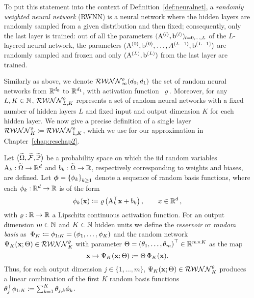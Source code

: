 To put this statement into the context of Definition~\ref{def:neuralnet}, a \textit{randomly weighted neural network} (RWNN) is a neural network where the hidden layers are randomly sampled from a given distribution and then fixed; consequently, only the last layer is trained:
out of all the parameters $(\mathrm{A}^{(l)}, \mathrm{b}^{(l)})_{l=0,\ldots,L}$ of the $L$-layered neural network, the parameters $(\mathrm{A}^{(0)}, \mathrm{b}^{(0)}, \ldots, A^{(L-1)}, \mathrm{b}^{(L-1)})$ are randomly sampled and frozen and only $(\mathrm{A}^{(L)}, \mathrm{b}^{(L)})$ from the last layer are trained. 

Similarly as above, we denote $\mathcal{RWNN}_{\infty}^{\varrho}(d_0,d_1)$ the set of random neural networks from $\mathbb{R}^{d_0}$ to $\mathbb{R}^{d_1}$, with activation function~$\varrho$. %
Moreover, for any $L, K \in \mathbb{N}$, $\mathcal{RWNN}_{L, K}^\varrho$ represents a set of random neural networks with a fixed number of hidden layers $L$ and fixed input and output dimension $K$ for each hidden layer. 
We now give a precise definition of a single layer $\mathcal{RWNN}^\varrho_{K}\coloneqq\mathcal{RWNN}^\varrho_{1, K}$, which we use for our approximation in Chapter~\ref{chap:reschap2}.

\begin{definition}\label{def:RWNN}
Let $\big(\widetilde{\Omega}, \widetilde{\mathcal{F}}, \widetilde{\mathbb{P}}\big)$ be a probability space on which the iid random variables $\mathrm{A}_{k}: \widetilde{\Omega} \rightarrow \mathbb{R}^{d}$ and $b_{k}: \widetilde{\Omega} \rightarrow \mathbb{R}$, respectively corresponding to weights and biases, are defined. Let $\boldsymbol{\phi}=\left\{\phi_{k}\right\}_{k \geq 1}$ denote a sequence of random basis functions, where each $\phi_{k}: \mathbb{R}^{d} \to\mathbb{R}$ is of the form
$$
\phi_{k}(\boldsymbol{\mathrm{x}})\coloneqq\varrho\left(\mathrm{A}_{k}^{\top} \boldsymbol{\mathrm{x}} + b_{k}\right), \qquad x\in\mathbb{R}^d\,,
$$
with $\varrho:\mathbb{R}\rightarrow\mathbb{R}$ a Lipschitz continuous activation function. 
For an output dimension $m\in\mathbb{N}$ and $K \in \mathbb{N}$ hidden units we define the \textit{reservoir} or \textit{random basis} as~$\Phi_{K}\coloneqq\nobreak\phi_{1:K}=(\phi_1,\dots,\phi_K)$ and the random network $\Psi_K(\boldsymbol{\mathrm{x}};\Theta)\in\mathcal{RWNN}^\varrho_K$ with parameter $\Theta=\left(\theta_{1}, \ldots, \theta_{m}\right)^\top \in \mathbb{R}^{m\times K}$ as the map %
\[
\boldsymbol{\mathrm{x}} \mapsto \Psi_K(\boldsymbol{\mathrm{x}};\Theta)\coloneqq\Theta\,\Phi_K(\boldsymbol{\mathrm{x}}).
\]
Thus, for each output dimension $j\in\{1,\dots,m\}$, $\Psi_K(\boldsymbol{\mathrm{x}};\Theta)\in\mathcal{RWNN}^\varrho_K$ produces a linear combination of the first $K$ random basis functions $\theta_j^\top\phi_{1:K}\coloneqq\sum_{k=1}^{K} \theta_{j,k} \phi_{k}$.
\end{definition}

